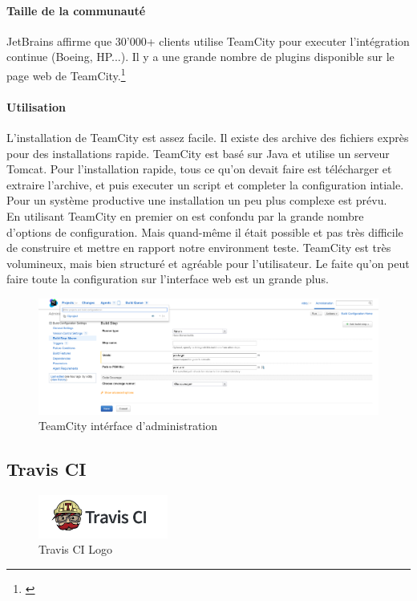 \paragraph{Taille de la communauté}
JetBrains affirme que 30'000+ clients utilise TeamCity pour executer l'intégration continue (Boeing, HP...). Il y a une grande nombre de plugins disponible sur le page web de TeamCity.\footnote{\citep{teamcityplugins}}
\paragraph{Utilisation}
L'installation de TeamCity est assez facile. Il existe des archive des fichiers exprès pour des installations rapide. TeamCity est basé sur Java et utilise un serveur Tomcat. Pour l'installation rapide, tous ce qu'on devait faire est télécharger et extraire l'archive, et puis executer un script et completer la configuration intiale. Pour un système productive une installation un peu plus complexe est prévu.\\
En utilisant TeamCity en premier on est confondu par la grande nombre d'options de configuration. Mais quand-même il était possible et pas très difficile de construire et mettre en rapport notre environment teste. TeamCity est très volumineux, mais bien structuré et agréable pour l'utilisateur. Le faite qu'on peut faire toute la configuration sur l'interface web est un grande plus.
\begin{figure}[H]
	\centering
		\includegraphics[scale=0.35]{bilder/teamcityadmin}
	\caption{TeamCity intérface d'administration}
	\label{fig:travisgui}
\end{figure}
\clearpage
\subsection{Travis CI}
\begin{figure}
  \begin{center}
    \includegraphics[width=0.38\textwidth]{bilder/Travis-CI-logo}
  \end{center}
  \caption{Travis CI Logo}
\end{figure}
